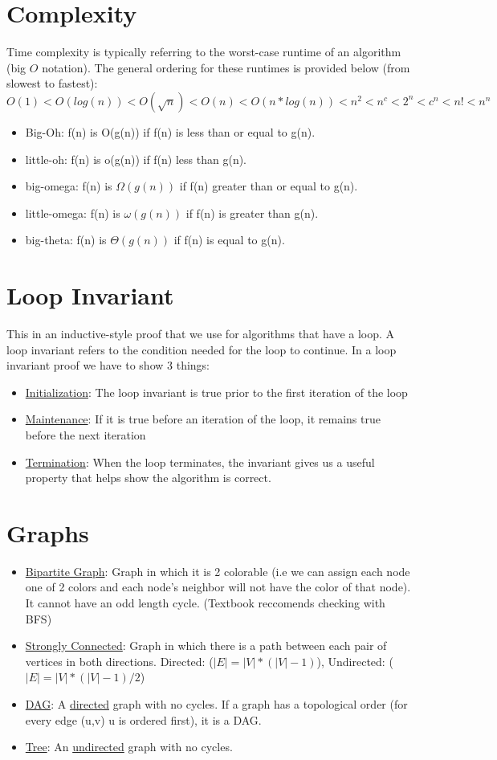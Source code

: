 \documentclass{article}
\begin{document}
\section{Complexity}
Time complexity is typically referring to the worst-case runtime of an algorithm (big $O$ notation). The general ordering for these runtimes is provided below (from slowest to fastest):
$O(1) < O(log(n)) < O(\sqrt{n}) < O(n) < O(n*log(n)) < n^2 < n^c < 2^n < c^n < n! < n^n$
\begin{itemize}
  \item Big-Oh: f(n) is O(g(n)) if f(n) is less than or equal to g(n).
  \item little-oh: f(n) is o(g(n)) if f(n) less than g(n).
  \item big-omega: f(n) is $\Omega (g(n))$ if f(n) greater than or equal to g(n).
  \item little-omega: f(n) is $\omega (g(n))$ if f(n) is greater than g(n).
  \item big-theta: f(n) is $\Theta (g(n))$ if f(n) is equal to g(n).
\end{itemize}

\section{Loop Invariant}
This in an inductive-style proof that we use for algorithms that have a loop. A loop invariant refers to the condition needed for the loop to continue. In a loop invariant proof we have to show 3 things:
\begin{itemize}
    \item \underline{Initialization}: The loop invariant is true prior to the first iteration of the loop
    \item \underline{Maintenance}: If it is true before an iteration of the loop, it remains true before the next iteration
    \item \underline{Termination}: When the loop terminates, the invariant gives us a useful property that helps show the algorithm is correct.
\end{itemize}

\section{Graphs}
\begin{itemize}
  \item \underline{Bipartite Graph}: Graph in which it is 2 colorable (i.e we can 
      assign each node one of 2 colors and each node's neighbor will not 
      have the color of that node). It cannot have an odd length cycle. (Textbook reccomends checking with BFS)
    \item \underline{Strongly Connected}: Graph in which there is a path between each 
      pair of vertices in both directions. Directed: ($|E| = |V|*(|V|-1)$), Undirected: ($|E| = |V|*(|V|-1)/2$)
    \item \underline{DAG}: A \underline{directed} graph with no cycles. If a graph has a topological order (for every
      edge (u,v) u is ordered first), it is a DAG.
    \item \underline{Tree}: An \underline{undirected} graph with no cycles. 
\end{itemize}
\end{document}
